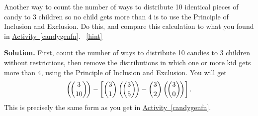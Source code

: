 \documentclass{book}
\begin{document}
\setcounter{project}{256}
\addtocounter{project}{-1}
\begin{activity}[]\label{activity-249}
\hypertarget{p-1393}{}%
Another way to count the number of ways to distribute 10 identical pieces of candy to 3 children so no child gets more than 4 is to use the Principle of Inclusion and Exclusion.  Do this, and compare this calculation to what you found in \hyperref[candygenfn]{Activity~\ref{candygenfn}}.%
~\hfill{\tiny\hyperlink{a-256}{[hint]}\hypertarget{q-256}{}}\par\smallskip%
\noindent\textbf{Solution.}\hypertarget{solution-192}{}\quad%
\hypertarget{p-1395}{}%
First, count the number of ways to distribute 10 candies to 3 children without restrictions, then remove the distributions in which one or more kid gets more than 4, using the Principle of Inclusion and Exclusion.  You will get%
\begin{equation*}
\left(\!\binom{3}{10}\!\right) - \left[ \binom{3}{1}\left(\!\binom{3}{5}\!\right) - \binom{3}{2}\left(\!\binom{3}{0}\!\right)\right].
\end{equation*}
This is precisely the same form as you get in \hyperref[candygenfn]{Activity~\ref{candygenfn}}.%
\end{activity}
\end{document}
